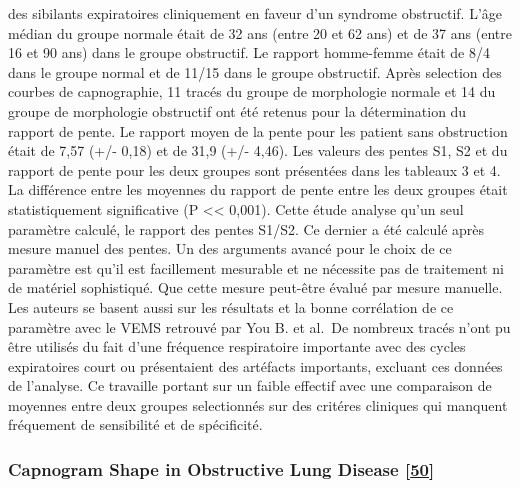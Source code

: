 \documentclass[12pt,]{article}
\begin{document}
des sibilants expiratoires cliniquement en faveur d'un syndrome
obstructif. L'âge médian du groupe normale était de 32 ans (entre 20 et
62 ans) et de 37 ans (entre 16 et 90 ans) dans le groupe obstructif. Le
rapport homme-femme était de 8/4 dans le groupe normal et de 11/15 dans
le groupe obstructif. Après selection des courbes de capnographie, 11
tracés du groupe de morphologie normale et 14 du groupe de morphologie
obstructif ont été retenus pour la détermination du rapport de pente. Le
rapport moyen de la pente pour les patient sans obstruction était de
7,57 (+/- 0,18) et de 31,9 (+/- 4,46). Les valeurs des pentes S1, S2 et
du rapport de pente pour les deux groupes sont présentées dans les
tableaux 3 et 4. La différence entre les moyennes du rapport de pente
entre les deux groupes était statistiquement significative (P
\textless{}\textless{} 0,001). Cette étude analyse qu'un seul paramètre
calculé, le rapport des pentes S1/S2. Ce dernier a été calculé après
mesure manuel des pentes. Un des arguments avancé pour le choix de ce
paramètre est qu'il est facillement mesurable et ne nécessite pas de
traitement ni de matériel sophistiqué. Que cette mesure peut-être évalué
par mesure manuelle. Les auteurs se basent aussi sur les résultats et la
bonne corrélation de ce paramètre avec le VEMS retrouvé par You B. et
al.~De nombreux tracés n'ont pu être utilisés du fait d'une fréquence
respiratoire importante avec des cycles expiratoires court ou
présentaient des artéfacts importants, excluant ces données de
l'analyse. Ce travaille portant sur un faible effectif avec une
comparaison de moyennes entre deux groupes selectionnés sur des critéres
cliniques qui manquent fréquement de sensibilité et de spécificité.

\hypertarget{capnogram-shape-in-obstructive-lung-disease-krauss2005capnogram}{%
\subsubsection{\texorpdfstring{Capnogram Shape in Obstructive Lung
Disease
{[}\protect\hyperlink{ref-krauss2005capnogram}{50}{]}}{Capnogram Shape in Obstructive Lung Disease {[}50{]}}}\label{capnogram-shape-in-obstructive-lung-disease-krauss2005capnogram}}
\end{document}
